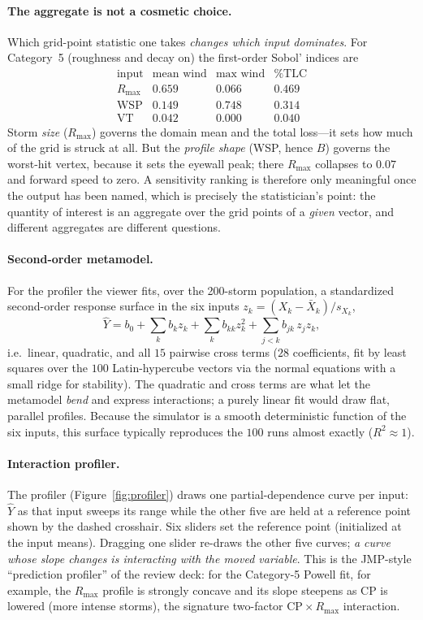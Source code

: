 \documentclass[11pt]{article}
\begin{document}
\paragraph{The aggregate is not a cosmetic choice.} Which grid-point statistic one
takes \emph{changes which input dominates}. For Category~5 (roughness and decay on)
the first-order Sobol' indices are
\[
\begin{array}{lccc}
\text{input} & \text{mean wind} & \text{max wind} & \%\text{TLC}\\\hline
R_{\max} & \mathbf{0.659} & 0.066 & \mathbf{0.469}\\
\text{WSP} & 0.149 & \mathbf{0.748} & 0.314\\
\text{VT} & 0.042 & 0.000 & 0.040
\end{array}
\]
Storm \emph{size} ($R_{\max}$) governs the domain mean and the total loss---it sets
how much of the grid is struck at all. But the \emph{profile shape} (WSP, hence $B$)
governs the worst-hit vertex, because it sets the eyewall peak; there $R_{\max}$
collapses to $0.07$ and forward speed to zero. A sensitivity ranking is therefore
only meaningful once the output has been named, which is precisely the
statistician's point: the quantity of interest is an aggregate over the grid points
of a \emph{given} vector, and different aggregates are different questions.

\paragraph{Second-order metamodel.}
For the profiler the viewer fits, over the 200-storm population, a standardized
second-order response surface in the six inputs $z_k=(X_k-\bar X_k)/s_{X_k}$,
\[
\hat Y=b_0+\sum_{k} b_k z_k+\sum_{k} b_{kk} z_k^{2}
        +\sum_{j<k} b_{jk}\,z_j z_k ,
\]
i.e.\ linear, quadratic, and all $15$ pairwise cross terms ($28$ coefficients,
fit by least squares over the $100$ Latin-hypercube vectors via the normal
equations with a small ridge for stability). The quadratic and cross terms are
what let the metamodel \emph{bend} and express interactions; a purely linear fit
would draw flat, parallel profiles. Because the simulator is a smooth
deterministic function of the six inputs, this surface typically reproduces the
$100$ runs almost exactly ($R^2\!\approx\!1$).

\paragraph{Interaction profiler.}
The profiler (Figure~\ref{fig:profiler}) draws one partial-dependence curve per
input: $\hat Y$ as that input sweeps its range while the other five are held at a
reference point shown by the dashed crosshair. Six sliders set the reference
point (initialized at the input means). Dragging one slider re-draws the other
five curves; \emph{a curve whose slope changes is interacting with the moved
variable}. This is the JMP-style ``prediction profiler'' of the review deck: for
the Category-5 Powell fit, for example, the $R_{\max}$ profile is strongly
concave and its slope steepens as CP is lowered (more intense storms), the
signature two-factor CP\,$\times$\,$R_{\max}$ interaction.
\end{document}
